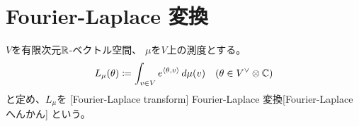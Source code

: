 \documentclass[report]{jlreq}
\begin{document}
%
\section{Fourier-Laplace 変換}


\begin{definition}
    $V$を有限次元$\mathbb{R}$-ベクトル空間、
    $\mu$を$V$上の測度とする。
    \begin{equation}
        L_\mu(\theta)
            \coloneqq
                \int_{v \in V}
                    e^{\left\langle{\theta},{v}\right\rangle}
                    \, d\mu(v)
                \quad
                (\theta \in V^\vee \otimes \mathbb{C})
    \end{equation}
    と定め、$L_\mu$を
    [Fourier-Laplace transform]
        {Fourier-Laplace 変換}[Fourier-Laplace へんかん]
    という。
\end{definition}
\end{document}
